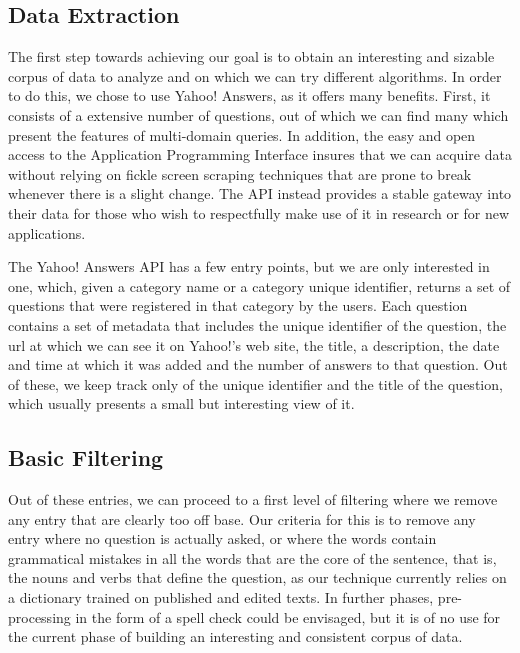 \subsection{Data Extraction} %
\label{sub:data_extraction}

The first step towards achieving our goal is to obtain an interesting and sizable corpus of data to analyze and on which we can try different algorithms. In order to do this, we chose to use Yahoo! Answers, as it offers many benefits. First, it consists of a extensive number of questions, out of which we can find many which present the features of multi-domain queries. In addition, the easy and open access to the Application Programming Interface insures that we can acquire data without relying on fickle screen scraping techniques that are prone to break whenever there is a slight change. The API instead provides a stable gateway into their data for those who wish to respectfully make use of it in research or for new applications.

The Yahoo! Answers API has a few entry points, but we are only interested in one, which, given a category name or a category unique identifier, returns a set of questions that were registered in that category by the users. Each question contains a set of metadata that includes the unique identifier of the question, the url at which we can see it on Yahoo!'s web site, the title, a description, the date and time at which it was added and the number of answers to that question. Out of these, we keep track only of the unique identifier and the title of the question, which usually presents a small but interesting view of it.


\subsection{Basic Filtering} %
\label{sub:basic_filtering}

Out of these entries, we can proceed to a first level of filtering where we remove any entry that are clearly too off base. Our criteria for this is to remove any entry where no question is actually asked, or where the words contain grammatical mistakes in all the words that are the core of the sentence, that is, the nouns and verbs that define the question, as our technique currently relies on a dictionary trained on published and edited texts. In further phases, pre-processing in the form of a spell check could be envisaged, but it is of no use for the current phase of building an interesting and consistent corpus of data.

